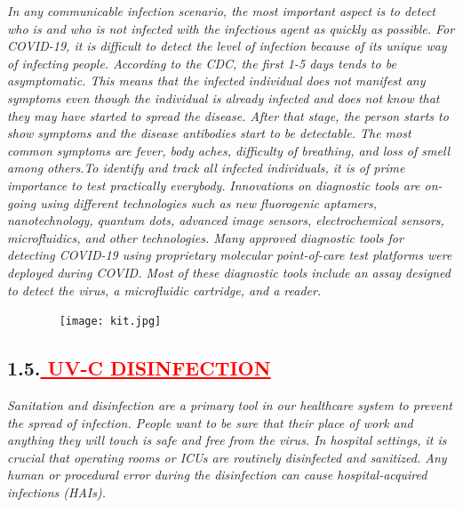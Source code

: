 \documentclass[12pt]{article}
\begin{document}
\hspace{1cm}\large{\emph{In any communicable infection scenario, the most important aspect is to detect who is and who is not infected with the infectious agent as quickly as possible. For COVID-19, it is difficult to detect the level of infection because of its unique way of infecting people.  According to the CDC, the first 1-5 days tends to be asymptomatic. This means that the infected individual does not manifest any symptoms even though the individual is already infected and does not know that they may have started to spread the disease.  After that stage, the person starts to show symptoms and the disease antibodies start to be detectable. The most common symptoms are fever, body aches, difficulty of breathing, and loss of smell among others.To identify and track all infected individuals, it is of prime importance to test practically everybody.}}\vspace{1cm}\newline
\hspace{1cm}\large{\emph{Innovations on diagnostic tools are on-going using different technologies such as new fluorogenic aptamers, nanotechnology, quantum dots, advanced image sensors, electrochemical sensors, microfluidics, and other technologies. Many approved diagnostic tools for detecting COVID-19 using proprietary molecular point-of-care test platforms were deployed during COVID. Most of these diagnostic tools include an assay designed to detect the virus, a microfluidic cartridge, and a reader.}}

\begin{figure}
    \centering
    \texttt{[image: kit.jpg]}
\end{figure}
\vspace{1cm}

\subsection*{\textbf{\hspace{1cm}1.5.\hspace{1cm}\textcolor{red}{\underline{\Large{ UV-C  DISINFECTION}}}}}

\hspace{1cm}\large{\emph{Sanitation and disinfection are a primary tool in our healthcare system to prevent the spread of infection.  People want to be sure that their place of work and anything they will touch is safe and free from the virus.  In hospital settings, it is crucial that operating rooms or ICUs are routinely disinfected and sanitized. Any human or procedural error during the disinfection can cause hospital-acquired infections (HAIs).}}\vspace{1cm}\newline
\end{document}

